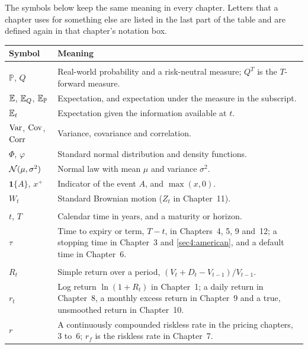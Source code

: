 The symbols below keep the same meaning in every chapter. Letters that a chapter uses for something
else are listed in the last part of the table and are defined again in that chapter's notation box.

\begingroup\small
\setlength{\LTpre}{6pt}\setlength{\LTpost}{0pt}
\begin{longtable}{@{}>{\raggedright\arraybackslash}p{}>{\raggedright\arraybackslash}p{}@{}}
\toprule
Symbol & Meaning\\
\midrule
\endhead
\bottomrule
\endfoot
\multicolumn{2}{@{}l}{\textbf{Probability}}\\
$\mathbb P$, $Q$ & Real-world probability and a risk-neutral measure; $Q^T$ is the $T$-forward measure.\\
$\mathbb{E}$, $\mathbb{E}_Q$, $\mathbb{E}_{\mathbb P}$ & Expectation, and expectation under the measure in the subscript.\\
$\mathbb{E}_t$ & Expectation given the information available at $t$.\\
$\operatorname{Var}$, $\operatorname{Cov}$, $\operatorname{Corr}$ & Variance, covariance and correlation.\\
$\Phi$, $\varphi$ & Standard normal distribution and density functions.\\
$\mathcal{N}(\mu,\sigma^2)$ & Normal law with mean $\mu$ and variance $\sigma^2$.\\
$\mathbf 1\{A\}$, $x^+$ & Indicator of the event $A$, and $\max(x,0)$.\\
$W_t$ & Standard Brownian motion ($Z_t$ in Chapter~11).\\[3pt]
\multicolumn{2}{@{}l}{\textbf{Time}}\\
$t$, $T$ & Calendar time in years, and a maturity or horizon.\\
$\tau$ & Time to expiry or term, $T-t$, in Chapters~4, 5, 9 and~12; a stopping time in Chapter~3 and
\cref{sec4:american}, and a default time in Chapter~6.\\[3pt]
\multicolumn{2}{@{}l}{\textbf{Returns and rates}}\\
$R_t$ & Simple return over a period, $(V_t+D_t-V_{t-1})/V_{t-1}$.\\
$r_t$ & Log return $\ln(1+R_t)$ in Chapter~1; a daily return in Chapter~8, a monthly excess return
in Chapter~9 and a true, unsmoothed return in Chapter~10.\\
$r$ & A continuously compounded riskless rate in the pricing chapters, 3 to~6; $r_f$ is the riskless
rate in Chapter~7.\\

\end{longtable}
